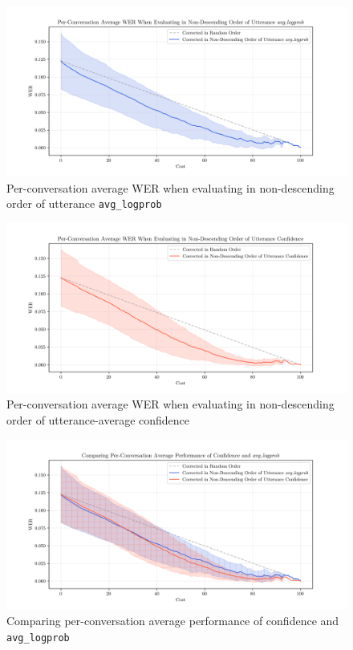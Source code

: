 \begin{figure}[p]
 \caption{Per-conversation average WER when evaluating in non-descending order of utterance \texttt{avg\_logprob}}
 \label{fig:average-avg-logprob}
 \centering
 \includegraphics[width=\textwidth]{figures/average-avg-logprob.png}
\end{figure}
\begin{figure}[p]
 \caption{Per-conversation average WER when evaluating in non-descending order of utterance-average confidence}
 \label{fig:average-uttconf}
 \includegraphics[width=\textwidth]{figures/average-uttconf.png}
 \centering
\end{figure}
\begin{figure}[p]
 \caption{Comparing per-conversation average performance of confidence and \texttt{avg\_logprob}}
 \label{fig:compare-avg-uttconf-vs-lprob}
 \includegraphics[width=\textwidth]{figures/compare-avg-uttconf-vs-lprob.png}
 \centering
\end{figure}
